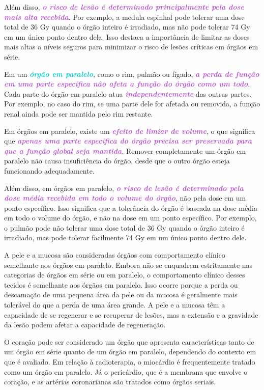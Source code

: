 \documentclass[11pt,a4paper]{article}
\newcounter{exemplo}
\begin{document}
	Além disso, \textcolor{MediumOrchid}{\textbf{\textit{o risco de lesão é determinado principalmente pela dose mais alta recebida}}}. Por exemplo, a medula espinhal pode tolerar uma dose total de 36 Gy quando o órgão inteiro é irradiado, mas não pode tolerar 74 Gy em um único ponto dentro dela. Isso destaca a importância de limitar as doses mais altas a níveis seguros para minimizar o risco de lesões críticas em órgãos em série.

	Em um \textcolor{DarkTurquoise}{\textbf{\textit{órgão em paralelo}}}, como o rim, pulmão ou fígado, \textcolor{MediumOrchid}{\textbf{\textit{a perda de função em uma parte específica não afeta a função do órgão como um todo}}}. Cada parte do órgão em paralelo atua \textcolor{MediumOrchid}{\textbf{\textit{independentemente}}} das outras partes. Por exemplo, no caso do rim, se uma parte dele for afetada ou removida, a função renal ainda pode ser mantida pelo rim restante.

	Em órgãos em paralelo, existe um \textcolor{MediumOrchid}{\textbf{\textit{efeito de limiar de volume}}}, o que significa que \textcolor{MediumOrchid}{\textbf{\textit{apenas uma parte específica do órgão precisa ser preservada para que a função global seja mantida}}}. Remover completamente um órgão em paralelo não causa insuficiência do órgão, desde que o outro órgão esteja funcionando adequadamente.
	
	Além disso, em órgãos em paralelo, \textcolor{MediumOrchid}{\textbf{\textit{o risco de lesão é determinado pela dose média recebida em todo o volume do órgão}}}, não pela dose em um ponto específico. Isso significa que a tolerância do órgão é baseada na dose média em todo o volume do órgão, e não na dose em um ponto específico. Por exemplo, o pulmão pode não tolerar uma dose total de 36 Gy quando o órgão inteiro é irradiado, mas pode tolerar facilmente 74 Gy em um único ponto dentro dele.

	A pele e a mucosa são consideradas órgãos com comportamento clínico semelhante aos órgãos em paralelo. Embora não se enquadrem estritamente nas categorias de órgãos em série ou em paralelo, o comportamento clínico desses tecidos é semelhante aos órgãos em paralelo. Isso ocorre porque a perda ou descamação de uma pequena área da pele ou da mucosa é geralmente mais tolerável do que a perda de uma área grande. A pele e a mucosa têm a capacidade de se regenerar e se recuperar de lesões, mas a extensão e a gravidade da lesão podem afetar a capacidade de regeneração.

	O coração pode ser considerado um órgão que apresenta características tanto de um órgão em série quanto de um órgão em paralelo, dependendo do contexto em que é avaliado. 	
	Em relação à radioterapia, o miocárdio é frequentemente tratado como um órgão em paralelo. Já o pericárdio, que é a membrana que envolve o coração, e as artérias coronarianas são tratados como órgãos seriais.
\end{document}
